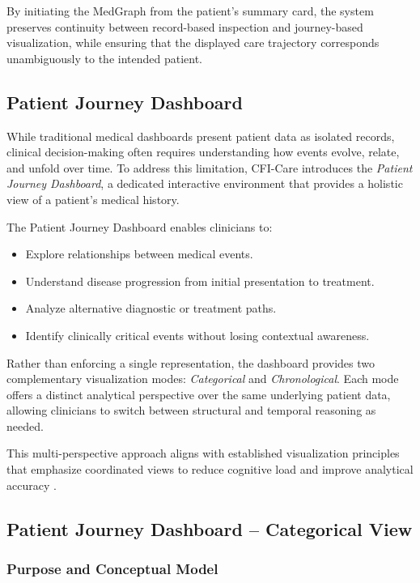 \documentclass{article}
\begin{document}
By initiating the MedGraph from the patient’s summary card, the system
preserves continuity between record-based inspection and journey-based
visualization, while ensuring that the displayed care trajectory corresponds
unambiguously to the intended patient.

\subsection{Patient Journey Dashboard}

While traditional medical dashboards present patient data as isolated records,
clinical decision-making often requires understanding how events evolve,
relate, and unfold over time. To address this limitation, CFI-Care introduces
the \textit{Patient Journey Dashboard}, a dedicated interactive environment
that provides a holistic view of a patient’s medical history.

The Patient Journey Dashboard enables clinicians to:
\begin{itemize}
    \item Explore relationships between medical events.
    \item Understand disease progression from initial presentation to treatment.
    \item Analyze alternative diagnostic or treatment paths.
    \item Identify clinically critical events without losing contextual awareness.
\end{itemize}

Rather than enforcing a single representation, the dashboard provides two
complementary visualization modes: \textit{Categorical} and
\textit{Chronological}. Each mode offers a distinct analytical perspective over
the same underlying patient data, allowing clinicians to switch between
structural and temporal reasoning as needed.

This multi-perspective approach aligns with established visualization
principles that emphasize coordinated views to reduce cognitive load and
improve analytical accuracy \cite{hospitalDashboards2022}.

\subsection{Patient Journey Dashboard -- Categorical View}

\subsubsection{Purpose and Conceptual Model}
\end{document}
